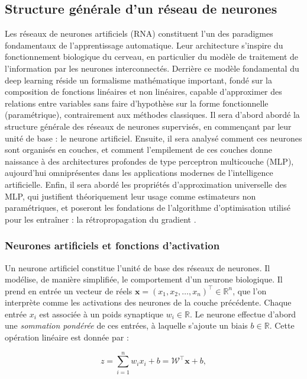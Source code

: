 \subsection{Structure générale d'un réseau de neurones}

Les réseaux de neurones artificiels (RNA) constituent l’un des paradigmes fondamentaux de l’apprentissage automatique. Leur architecture s’inspire du fonctionnement biologique du cerveau, en particulier du modèle de traitement de l'information par les neurones interconnectés. Derrière ce modèle fondamental du deep learning réside un formalisme mathématique important, fondé sur la composition de fonctions linéaires et non linéaires, capable d’approximer des relations entre variables sans faire d'hypothèse sur la forme fonctionnelle (paramétrique), contrairement aux méthodes classiques. Il sera d'abord abordé la structure générale des réseaux de neurones supervisés, en commençant par leur unité de base : le neurone artificiel. Ensuite, il sera analysé comment ces neurones sont organisés en couches, et comment l’empilement de ces couches donne naissance à des architectures profondes de type perceptron multicouche (MLP), aujourd’hui omniprésentes dans les applications modernes de l’intelligence artificielle. Enfin, il sera abordé les propriétés d’approximation universelle des MLP, qui justifient théoriquement leur usage comme estimateurs non paramétriques, et poseront les fondations de l’algorithme d’optimisation utilisé pour les entraîner : la rétropropagation du gradient \citep{lecun1998gradient}.

\subsubsection{Neurones artificiels et fonctions d’activation}

Un neurone artificiel constitue l’unité de base des réseaux de neurones. Il modélise, de manière simplifiée, le comportement d’un neurone biologique. Il prend en entrée un vecteur de réels \( \mathbf{x} = (x_1, x_2, \dots, x_n)^\top \in \mathbb{R}^n \), que l'on interprète comme les activations des neurones de la couche précédente. Chaque entrée \( x_i \) est associée à un poids synaptique \( w_i \in \mathbb{R} \). Le neurone effectue d’abord une \textit{sommation pondérée} de ces entrées, à laquelle s’ajoute un biais \( b \in \mathbb{R} \). Cette opération linéaire est donnée par :

\begin{equation}
z = \sum_{i=1}^{n} w_i x_i + b = \mathbf{\mathcal{W}}^\top \mathbf{x} + b,
\end{equation}

